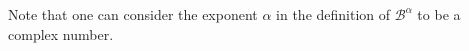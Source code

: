 \documentclass[a4paper,12pt]{amsart}
\begin{document}
%




Note that one can consider the exponent $\alpha$ in the definition of $\mathcal B^{\alpha}$ to be a complex number. 
\end{document}
